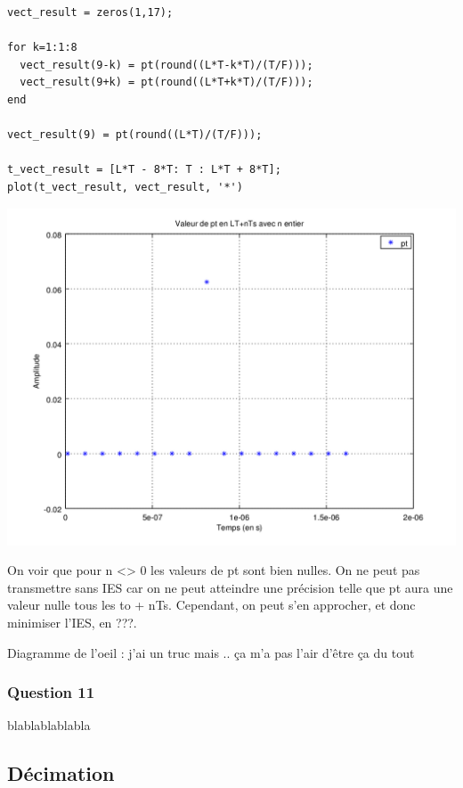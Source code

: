 \documentclass{acm_proc_article-sp}
\begin{document}
\begin{center}
\begin{lstlisting}
vect_result = zeros(1,17);

for k=1:1:8
  vect_result(9-k) = pt(round((L*T-k*T)/(T/F)));
  vect_result(9+k) = pt(round((L*T+k*T)/(T/F)));
end

vect_result(9) = pt(round((L*T)/(T/F)));

t_vect_result = [L*T - 8*T: T : L*T + 8*T];
plot(t_vect_result, vect_result, '*')
\end{lstlisting}

\includegraphics[scale=0.45]{pt_nyquist_10.png}
\end{center}

On voir que pour n <> 0 les valeurs de pt sont bien nulles. On ne peut pas transmettre sans IES car on ne peut atteindre une précision telle que pt aura une valeur nulle tous les to + nTs. Cependant, on peut s'en approcher, et donc minimiser l'IES, en ???.

Diagramme de l'oeil : j'ai un truc mais .. ça m'a pas l'air d'être ça du tout

\subsubsection{Question 11}

blablablablabla

\subsection{Décimation}
\end{document}
